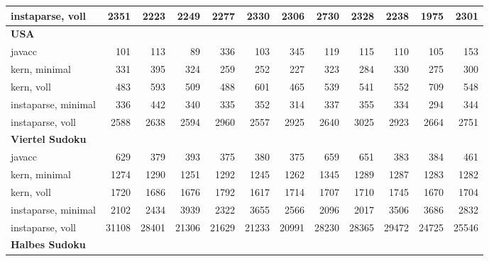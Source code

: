 \documentclass[ngerman,a4paper,abstracton,open=right,twoside=false,toc=listofnumbered,bibtotocnumbered]{scrreprt}
\begin{document}
\begin{table}[!h]
{{\begin{tabular}{|l|r|r|r|r|r|r|r|r|r|r|r|}
				instaparse, voll   & 2351 & 2223 & 2249 & 2277 & 2330 & 2306 & 2730 & 2328 & 2238 & 1975 & 2301 \\ \hline
				\textbf{USA} & \multicolumn{1}{l|}{\textbf{}} & \multicolumn{1}{l|}{\textbf{}} & \multicolumn{1}{l|}{\textbf{}} & \multicolumn{1}{l|}{\textbf{}} & \multicolumn{1}{l|}{\textbf{}} & \multicolumn{1}{l|}{\textbf{}} & \multicolumn{1}{l|}{\textbf{}} & \multicolumn{1}{l|}{\textbf{}} & \multicolumn{1}{l|}{\textbf{}} & \multicolumn{1}{l|}{\textbf{}} & \multicolumn{1}{l|}{\textbf{}} \\ \hline
				javacc  & 101 & 113 & 89 & 336 & 103 & 345 & 119 & 115 & 110 & 105 & 153 \\ \hline
				kern, minimal   & 331 & 395 & 324 & 259 & 252 & 227 & 323 & 284 & 330 & 275 & 300 \\ \hline
				kern, voll   & 483 & 593 & 509 & 488 & 601 & 465 & 539 & 541 & 552 & 709 & 548 \\ \hline
				instaparse, minimal   & 336 & 442 & 340 & 335 & 352 & 314 & 337 & 355 & 334 & 294 & 344 \\ \hline
				instaparse, voll   & 2588 & 2638 & 2594 & 2960 & 2557 & 2925 & 2640 & 3025 & 2923 & 2664 & 2751 \\ \hline
				\textbf{Viertel Sudoku} & \multicolumn{1}{l|}{} & \multicolumn{1}{l|}{} & \multicolumn{1}{l|}{} & \multicolumn{1}{l|}{} & \multicolumn{1}{l|}{} & \multicolumn{1}{l|}{} & \multicolumn{1}{l|}{} & \multicolumn{1}{l|}{} & \multicolumn{1}{l|}{} & \multicolumn{1}{l|}{} & \multicolumn{1}{l|}{} \\ \hline
				javacc  & 629 & 379 & 393 & 375 & 380 & 375 & 659 & 651 & 383 & 384 & 461 \\ \hline
				kern, minimal   & 1274 & 1290 & 1251 & 1292 & 1245 & 1262 & 1345 & 1289 & 1287 & 1283 & 1282 \\ \hline
				kern, voll   & 1720 & 1686 & 1676 & 1792 & 1617 & 1714 & 1707 & 1710 & 1745 & 1670 & 1704 \\ \hline
				instaparse, minimal   & 2102 & 2434 & 3939 & 2322 & 3655 & 2566 & 2096 & 2017 & 3506 & 3686 & 2832 \\ \hline
				instaparse, voll   & 31108 & 28401 & 21306 & 21629 & 21233 & 20991 & 28230 & 28365 & 29472 & 24725 & 25546 \\ \hline
				\textbf{Halbes Sudoku} & \multicolumn{1}{l|}{} & \multicolumn{1}{l|}{} & \multicolumn{1}{l|}{} & \multicolumn{1}{l|}{} & \multicolumn{1}{l|}{} & \multicolumn{1}{l|}{} & \multicolumn{1}{l|}{} & \multicolumn{1}{l|}{} & \multicolumn{1}{l|}{} & \multicolumn{1}{l|}{} & \multicolumn{1}{l|}{} \\ \hline

\end{tabular}}}
\end{table}
\end{document}
